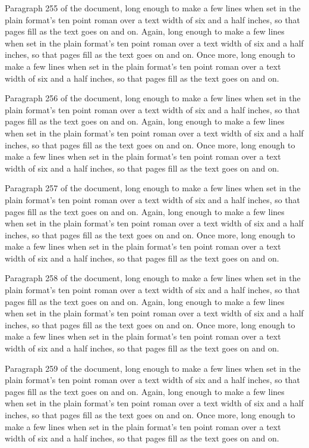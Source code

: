Paragraph 255 of the document, long enough to make a few lines when set in the plain format's ten point roman over a text width of six and a half inches, so that pages fill as the text goes on and on. Again, long enough to make a few lines when set in the plain format's ten point roman over a text width of six and a half inches, so that pages fill as the text goes on and on. Once more, long enough to make a few lines when set in the plain format's ten point roman over a text width of six and a half inches, so that pages fill as the text goes on and on.

Paragraph 256 of the document, long enough to make a few lines when set in the plain format's ten point roman over a text width of six and a half inches, so that pages fill as the text goes on and on. Again, long enough to make a few lines when set in the plain format's ten point roman over a text width of six and a half inches, so that pages fill as the text goes on and on. Once more, long enough to make a few lines when set in the plain format's ten point roman over a text width of six and a half inches, so that pages fill as the text goes on and on.

Paragraph 257 of the document, long enough to make a few lines when set in the plain format's ten point roman over a text width of six and a half inches, so that pages fill as the text goes on and on. Again, long enough to make a few lines when set in the plain format's ten point roman over a text width of six and a half inches, so that pages fill as the text goes on and on. Once more, long enough to make a few lines when set in the plain format's ten point roman over a text width of six and a half inches, so that pages fill as the text goes on and on.

Paragraph 258 of the document, long enough to make a few lines when set in the plain format's ten point roman over a text width of six and a half inches, so that pages fill as the text goes on and on. Again, long enough to make a few lines when set in the plain format's ten point roman over a text width of six and a half inches, so that pages fill as the text goes on and on. Once more, long enough to make a few lines when set in the plain format's ten point roman over a text width of six and a half inches, so that pages fill as the text goes on and on.

Paragraph 259 of the document, long enough to make a few lines when set in the plain format's ten point roman over a text width of six and a half inches, so that pages fill as the text goes on and on. Again, long enough to make a few lines when set in the plain format's ten point roman over a text width of six and a half inches, so that pages fill as the text goes on and on. Once more, long enough to make a few lines when set in the plain format's ten point roman over a text width of six and a half inches, so that pages fill as the text goes on and on.

\bye
